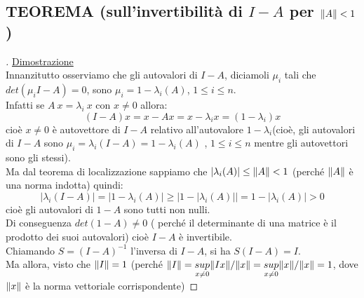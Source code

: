 \documentclass[12pt,a4paper]{article}
\DeclarePairedDelimiter{\norma}{\lVert}{\rVert}
\begin{document}
\subsection{TEOREMA (sull'invertibilità di $I-A$ per $\norma{A}<1$)}
\begin{center}
\end{center}
\begin{proof}[\unskip\nopunct]
\uline{Dimostrazione}\\
Innanzitutto osserviamo che gli autovalori di $I-A$, diciamoli $\mu_i$ tali che $det(\mu_iI-A)=0$,
sono $ \mu_i = 1 - \lambda_i (A)$, $1 \leq i \leq n$.\\
Infatti se $ A\ x = \lambda_i\ x$ con $x \neq 0$ allora:
\begin{equation*}
    (I-A)x = x-A x = x - \lambda_i x = (1- \lambda_i) x
\end{equation*}
cioè $x\neq 0$ è autovettore di $I-A$ relativo all'autovalore $1-\lambda_i$(cioè, gli autovalori di $I-A$ sono $\mu_i=\lambda_i(I-A)=1-\lambda_i(A)$ , $1\leq i \leq n$ mentre gli autovettori sono gli stessi).\\
Ma dal teorema di localizzazione sappiamo che $|\lambda_i(A)|\leq \norma{ A }< 1$ (perché $\norma{ A }$ è una norma indotta) quindi:
\begin{equation*}
    | \lambda_i(I-A) | = | 1-\lambda_i(A) | \geq \big | 1-|\lambda_i(A)| \big | = 1 - | \lambda_i(A) | > 0
\end{equation*}
cioè gli autovalori di $1-A$ sono tutti non nulli. \\
Di conseguenza $det(1-A)\neq 0$ ( perché il determinante di una matrice è il prodotto dei suoi autovalori) cioè $I-A$ è invertibile.\\
Chiamando $S = (I-A)^{-1}$ l'inversa di $I-A$, si ha $S(I-A) = I$. \\ Ma allora, visto che $\norma{I} = 1$ (perché $\norma{I} = \underset{x \neq 0}{sup}\norma{Ix}/\norma{x} =\underset{x \neq 0}{sup}\norma{x}/\norma{x} = 1 $, dove $\norma{x}$ è la norma vettoriale corrispondente)

\end{proof}
\end{document}
